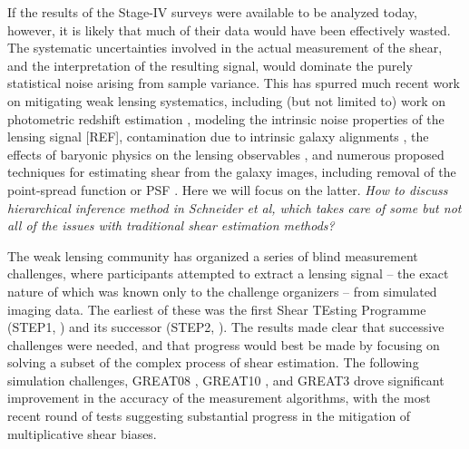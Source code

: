 \documentclass[iop]{emulateapj}
\begin{document}
If the results of the Stage-IV surveys were available to be analyzed today, however, it is likely
that much of their data would have been effectively wasted. The systematic uncertainties involved in
the actual measurement of the shear, and the interpretation of the resulting signal, would dominate
the purely statistical noise arising from sample variance. This has spurred much recent work on
mitigating weak lensing systematics, including (but not limited to) work on photometric redshift
estimation \citep[e.g.,][]{2010A&A...523A..31H}, modeling the intrinsic noise properties of the
lensing signal [REF], contamination due to intrinsic galaxy alignments
\citep{2014arXiv1407.6990T,2015arXiv150405456J,2015arXiv150405546K,2015arXiv150405465K}, the effects
of baryonic physics on the lensing observables
\citep{2011MNRAS.417.2020S,2014MNRAS.445.3382M,2015arXiv150102055O}, and numerous proposed
techniques for estimating shear from the galaxy images, including removal of the point-spread
function or PSF 
\citep[e.g.,]{1995ApJ...449..460K,2000ApJ...537..555K,2000ApJ...536...79R,2002AJ....123..583B,2003MNRAS.343..459H,2005MNRAS.363..197M,2009MNRAS.398..471L,2009MNRAS.396.1211N,2010MNRAS.405.2044B,2010MNRAS.406.2793B,2010AJ....140..870B,2010ApJ...720..639G,2011MNRAS.410.2156V,2011MNRAS.414.1047Z,2013MNRAS.434.1604Z,2013MNRAS.429.2858M,2014MNRAS.438.1880B}. Here
we will focus on the latter. {\em How to discuss hierarchical inference method in Schneider et al,
  which takes care of some but not all of the issues with traditional shear estimation methods?}

The weak lensing community has organized a series of blind measurement challenges, where
participants attempted to extract a lensing signal -- the exact nature of which was known only to
the challenge organizers -- from simulated imaging data. The earliest of these was the first Shear
TEsting Programme (STEP1, \citealt{2006MNRAS.368.1323H}) and its successor (STEP2, \citealt{2007MNRAS.376...13M}). The results made clear that
successive challenges were needed, and that progress would best be made by focusing on solving a
subset of the complex process of shear estimation. The following simulation challenges, GREAT08
\citep{2009AnApS...3....6B,2010MNRAS.405.2044B}, GREAT10 \citep{2010arXiv1009.0779K,2012MNRAS.423.3163K}, and GREAT3 \citep{2014ApJS..212....5M,2015MNRAS.450.2963M} drove significant improvement in the accuracy of the
measurement algorithms, with the most recent round of tests suggesting substantial progress in the
mitigation of multiplicative shear biases.
\end{document}
